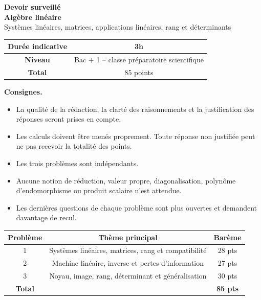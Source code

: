 \documentclass[11pt,a4paper]{article}
\begin{document}
\begin{center}
    {\Huge \textbf{Devoir surveillé}}\\[0.2cm]
    {\Large \textbf{Algèbre linéaire}}\\[0.2cm]
    {\large Systèmes linéaires, matrices, applications linéaires, rang et déterminants}\\[0.4cm]
\end{center}

\begin{center}
\begin{tabular}{|>{\bfseries}c|c|}
\hline
Durée indicative & 3h \\
\hline
Niveau & Bac + 1 -- classe préparatoire scientifique \\
\hline
Total & 85 points \\
\hline
\end{tabular}
\end{center}

\vspace{0.3cm}

\textbf{Consignes.}
\begin{itemize}
    \item La qualité de la rédaction, la clarté des raisonnements et la justification des réponses seront prises en compte.
    \item Les calculs doivent être menés proprement. Toute réponse non justifiée peut ne pas recevoir la totalité des points.
    \item Les trois problèmes sont indépendants.
    \item Aucune notion de réduction, valeur propre, diagonalisation, polynôme d'endomorphisme ou produit scalaire n'est attendue.
    \item Les dernières questions de chaque problème sont plus ouvertes et demandent davantage de recul.
\end{itemize}

\vspace{0.2cm}

\begin{center}
\begin{tabular}{|c|c|c|}
\hline
Problème & Thème principal & Barème \\
\hline
1 & Systèmes linéaires, matrices, rang et compatibilité & 28 pts \\
\hline
2 & Machine linéaire, inverse et pertes d'information & 27 pts \\
\hline
3 & Noyau, image, rang, déterminant et généralisation & 30 pts \\
\hline
\textbf{Total} & & \textbf{85 pts} \\
\hline
\end{tabular}
\end{center}
\end{document}
